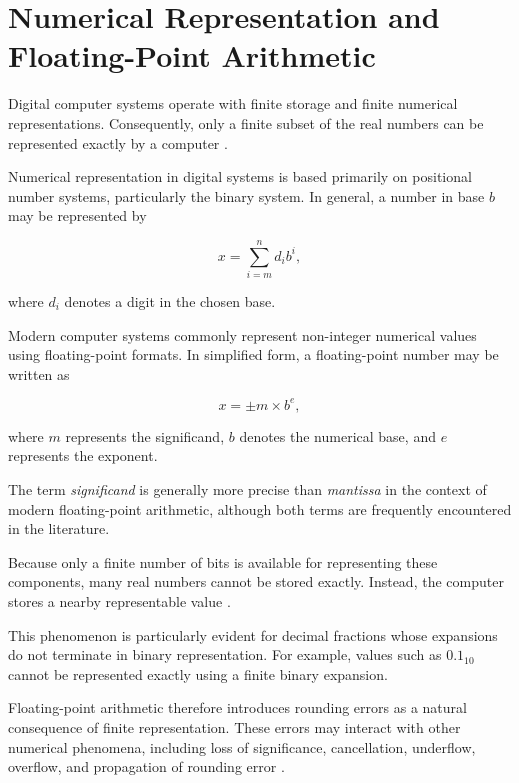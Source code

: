 
\section{Numerical Representation and Floating-Point Arithmetic}

Digital computer systems operate with finite storage and finite numerical
representations. Consequently, only a finite subset of the real numbers can be
represented exactly by a computer
\cite{goldberg1991floating,higham2002accuracy}.

Numerical representation in digital systems is based primarily on positional
number systems, particularly the binary system. In general, a number in base
$b$ may be represented by

\begin{equation}
    x =
    \sum_{i=m}^{n} d_i b^i,
\end{equation}

where $d_i$ denotes a digit in the chosen base.

Modern computer systems commonly represent non-integer numerical values using
floating-point formats. In simplified form, a floating-point number may be
written as

\begin{equation}
    x = \pm m \times b^e,
\end{equation}

where $m$ represents the significand, $b$ denotes the numerical base, and $e$
represents the exponent.

The term \textit{significand} is generally more precise than \textit{mantissa}
in the context of modern floating-point arithmetic, although both terms are
frequently encountered in the literature.

Because only a finite number of bits is available for representing these
components, many real numbers cannot be stored exactly. Instead, the computer
stores a nearby representable value
\cite{goldberg1991floating,higham2002accuracy}.

This phenomenon is particularly evident for decimal fractions whose expansions
do not terminate in binary representation. For example, values such as
$0.1_{10}$ cannot be represented exactly using a finite binary expansion.

Floating-point arithmetic therefore introduces rounding errors as a natural
consequence of finite representation. These errors may interact with other
numerical phenomena, including loss of significance, cancellation, underflow,
overflow, and propagation of rounding error
\cite{goldberg1991floating,higham2002accuracy}.

